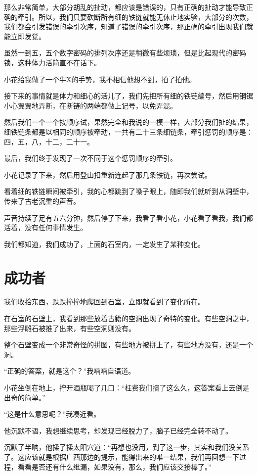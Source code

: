 那么非常简单，大部分胡乱的扯动，都应该是错误的，只有正确的扯动才能导致正确的牵引。所以，我们只要砍断所有细的铁链就能无休止地实验，大部分的次数，我们都会引发错误的牵引次序，知道了错误的牵引次序，那正确的牵引出现我们就能立即发觉。

虽然一到五，五个数字密码的排列次序还是稍微有些烦琐，但是比起现代的密码锁，这种体力活简直不在话下。

小花给我做了一个牛X的手势，我不相信他想不到，拍了拍他。

接下来的事情就是体力和细心的活儿了，我们先把所有细的铁链编号，然后用钢锯小心翼翼地弄断，在断链的两端都做上记号，以免弄混。

然后我们一个一个按顺序试，果然完全和我说的一模一样，大部分我们扯的结果，细铁链条都是以相同的顺序被牵动，一共有二十三条细链条，牵引惩罚的顺序是：四，五，八，十二，二十一。

最后，我们终于发现了一次不同于这个惩罚顺序的牵引。

小花记录了下来，然后用登山扣重新连起了那几条铁链，再次尝试。

看着细的铁链瞬间被牵引，我的心都跳到了嗓子眼上，随即我们就听到从洞壁中，传来了古老沉重的声音。

声音持续了足有五六分钟，然后停了下来，我看了看小花，小花看了看我，我们都活着，没有任何事情发生。

我们都知道，我们成功了，上面的石室内，一定发生了某种变化。

\chapter{成功者}

我们收拾东西，跌跌撞撞地爬回到石室，立即就看到了变化所在。

在石室的石壁上，我看到那些放着古籍的空洞出现了奇特的变化。有些空洞之中，那些浮雕石被推了出来，有些空洞则没有。

整个石壁变成一个非常奇怪的拼图，有些地方被拼上了，有些地方没有，还是一个洞。

“正确的答案，就是这个？”我喃喃自语道。

小花坐倒在地上，拧开酒瓶喝了几口：“枉费我们搞了这么久，这答案看上去倒是出奇的简单。”

“这是什么意思呢？”我凑近看。

他沉默不语，我想继续思考，却发现已经脱力了，脑子已经完全转不动了。

沉默了半晌，他揉了揉太阳穴道：“再想也没用，到了这一步，其实和我们没关系了。这应该就是根据广西那边的提示，能得出来的唯一结果，我们再回想一下过程，看看是否还有什么纰漏，如果没有，那么，我们应该交接棒了。”

